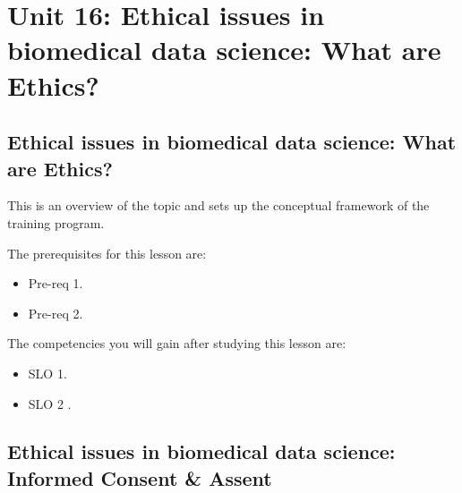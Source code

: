 \chapter{Unit 16: Ethical issues in biomedical data science: What are Ethics?}
\label{chap:unit16}

\section{Ethical issues in biomedical data science: What are Ethics?}
\label{sec:ethical-issues-in-biomedical-data-science-what-are-ethics}

This is an overview of the topic and sets up the conceptual framework of the training program.




The prerequisites for this lesson are: 




\begin{itemize}
    \item Pre-req 1.
\end{itemize}

\begin{itemize}
    \item Pre-req 2.
\end{itemize}




The competencies you will gain after studying this lesson are: 




\begin{itemize}
    \item SLO 1.
\end{itemize}

\begin{itemize}
    \item SLO 2 .
\end{itemize}

\section{Ethical issues in biomedical data science: Informed Consent \& Assent}
\label{sec:ethical-issues-in-biomedical-data-science-informed-consent-assent}

